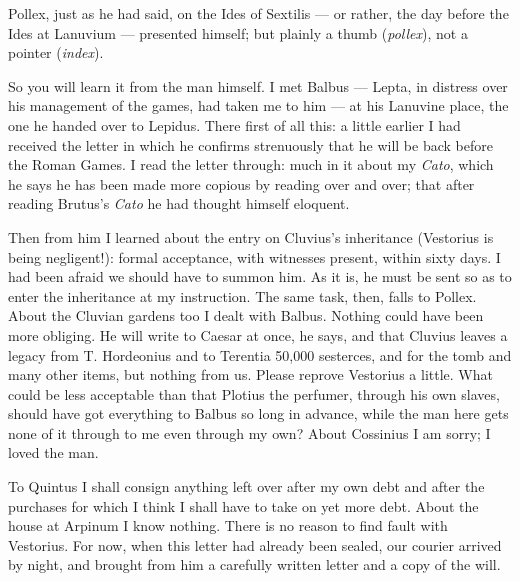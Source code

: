 

 Pollex, just as he had said, on the Ides of Sextilis --- or rather, the day before the Ides at Lanuvium --- presented himself; but plainly a thumb (\textit{pollex}), not a pointer (\textit{index}).

 So you will learn it from the man himself. I met Balbus --- Lepta, in distress over his management of the games, had taken me to him --- at his Lanuvine place, the one he handed over to Lepidus. There first of all this: a little earlier I had received the letter in which he confirms strenuously that he will be back before the Roman Games. I read the letter through: much in it about my \textit{Cato}, which he says he has been made more copious by reading over and over; that after reading Brutus's \textit{Cato} he had thought himself eloquent.

 Then from him I learned about the entry on Cluvius's inheritance (Vestorius is being negligent!): formal acceptance, with witnesses present, within sixty days. I had been afraid we should have to summon him. As it is, he must be sent so as to enter the inheritance at my instruction. The same task, then, falls to Pollex. About the Cluvian gardens too I dealt with Balbus. Nothing could have been more obliging. He will write to Caesar at once, he says, and that Cluvius leaves a legacy from T. Hordeonius and to Terentia 50,000 sesterces, and for the tomb and many other items, but nothing from us. Please reprove Vestorius a little. What could be less acceptable than that Plotius the perfumer, through his own slaves, should have got everything to Balbus so long in advance, while the man here gets none of it through to me even through my own? About Cossinius I am sorry; I loved the man.

 To Quintus I shall consign anything left over after my own debt and after the purchases for which I think I shall have to take on yet more debt. About the house at Arpinum I know nothing. There is no reason to find fault with Vestorius. For now, when this letter had already been sealed, our courier arrived by night, and brought from him a carefully written letter and a copy of the will.

